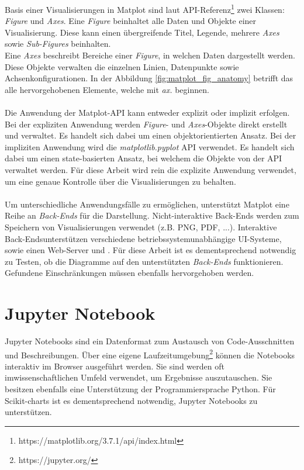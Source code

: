 \noindent Basis einer Visualisierungen in Matplot sind laut API-Referenz\footnote{https://matplotlib.org/3.7.1/api/index.html} zwei Klassen: \emph{Figure} und \emph{Axes}. Eine \emph{Figure} beinhaltet alle Daten und Objekte einer Visualisierung. Diese kann einen übergreifende Titel, Legende, mehrere \emph{Axes} sowie \emph{Sub-Figures} beinhalten.\\
\noindent Eine \emph{Axes} beschreibt Bereiche einer \emph{Figure}, in welchen Daten dargestellt werden. Diese Objekte verwalten die einzelnen Linien, Datenpunkte sowie Achsenkonfigurationen. In der Abbildung \ref{fig:matplot_fig_anatomy} betrifft das alle hervorgehobenen Elemente, welche mit \emph{ax.} beginnen.\\\\
\noindent Die Anwendung der Matplot-API kann entweder explizit oder implizit erfolgen. Bei der expliziten Anwendung werden \emph{Figure}- und \emph{Axes}-Objekte direkt erstellt und verwaltet. Es handelt sich dabei um einen objektorientierten Ansatz. Bei der impliziten Anwendung wird die \emph{matplotlib.pyplot} API verwendet. Es handelt sich dabei um einen state-basierten Ansatz, bei welchem die Objekte von der API verwaltet werden. Für diese Arbeit wird rein die explizite Anwendung verwendet, um eine genaue Kontrolle über die Visualisierungen zu behalten.\\\\
\noindent Um unterschiedliche Anwendungsfälle zu ermöglichen, unterstützt Matplot eine Reihe an \emph{Back-Ends} für die Darstellung. Nicht-interaktive Back-Ends werden zum Speichern von Visualisierungen verwendet (z.B. PNG, PDF, ...). Interaktive Back-Ends\linebreak unterstützen verschiedene betriebssystemunabhängige UI-Systeme, sowie einen Web-Server und . Für diese Arbeit ist es dementsprechend notwendig zu Testen, ob die Diagramme auf den unterstützten \emph{Back-Ends} funktionieren. Gefundene Einschränkungen müssen ebenfalls hervorgehoben werden.

\section{Jupyter Notebook}
\label{sec:jupyter_notebook}

Jupyter Notebooks \parencite{kluyver2016JupyterN} sind ein Datenformat zum Austausch von Code-Ausschnitten und Beschreibungen. Über eine eigene Laufzeitumgebung\footnote{https://jupyter.org/} können die Notebooks interaktiv im Browser ausgeführt werden. Sie sind werden oft im\linebreak wissenschaftlichen Umfeld verwendet, um Ergebnisse auszutauschen. Sie besitzen ebenfalls eine Unterstützung der Programmiersprache Python. Für Scikit-charts ist es dementsprechend notwendig, Jupyter Notebooks zu unterstützen.

